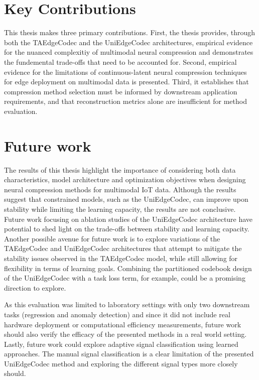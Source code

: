 \section{Key Contributions} 

This thesis makes three primary contributions. First, the thesis provides, through both the TAEdgeCodec and the UniEdgeCodec architectures, empirical evidence for the nuanced complexitiy of multimodal neural compression and demonstrates the fundemental trade-offs that need to be accounted for. Second, empirical evidence for the limitations of continuous-latent neural compression techniques for edge deployment on multimodal data is presented. Third, it establishes that compression method selection must be informed by downstream application requirements, and that reconstruction metrics alone are insufficient for method evaluation. 

\section{Future work}
The results of this thesis highlight the importance of considering both data characteristics, model architecture and optimization objectives when designing neural compression methods for multimodal IoT data. Although the results suggest that constrained models, such as the UniEdgeCodec, can improve upon stability while limiting the learning capacity, the results are not conclusive. Future work focusing on ablation studies of the UniEdgeCodec architecture have potential to shed light on the trade-offs between stability and learning capacity. Another possible avenue for future work is to explore variations of the TAEdgeCodec and UniEdgeCodec architectures that attempt to mitigate the stability issues observed in the TAEdgeCodec model, while still allowing for flexibility in terms of learning goals. Combining the partitioned codebook design of the UniEdgeCodec with a task loss term, for example, could be a promising direction to explore. 

As this evaluation was limited to laboratory settings with only two downstream tasks (regression and anomaly detection) and since it did not include real hardware deployment or computational efficiency measurements, future work should also verify the efficacy of the presented methods in a real world setting. Lastly, future work could explore adaptive signal classification using learned approaches. The manual signal classification is a clear limitation of the presented UniEdgeCodec method and exploring the different signal types more closely should.
